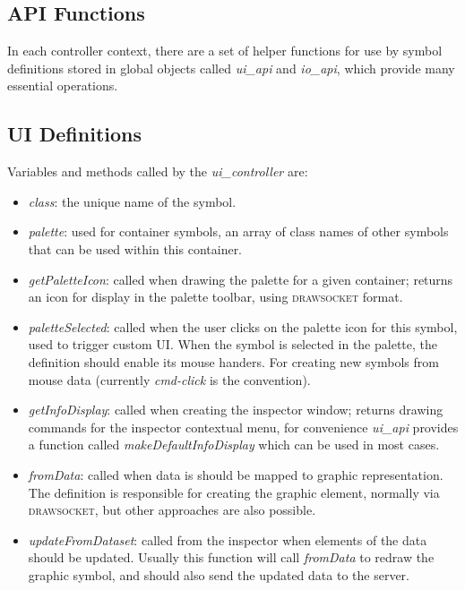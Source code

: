 \documentclass{article}
\def\drawsocket{\textsc{drawsocket}\xspace}
\def\uicontroller{\textit{ui\_controller}\xspace}
\def\uiapi{\textit{ui\_api}\xspace}
\def\ioapi{\textit{io\_api}\xspace}
\begin{document}
\subsection*{API Functions}\label{sec:api_functions}

In each controller context, there are a set of helper functions for use by symbol definitions stored in global objects called \uiapi and \ioapi, which provide many essential operations.

\subsection{UI Definitions}\label{sec:ui_callbacks}

Variables and methods called by the \uicontroller are:

\begin{itemize}\itemsep0pt 
\item \textit{class}: the unique name of the symbol.
\item \textit{palette}: used for container symbols, an array of class names of other symbols that can be used within this container.

\item \textit{getPaletteIcon}: called when drawing the palette for a given container; returns an icon for display in the palette toolbar, using \drawsocket format.

\item \textit{paletteSelected}: called when the user clicks on the palette icon for this symbol, used to trigger custom UI. When the symbol is selected in the palette, the definition should enable its mouse handers. For creating new symbols from mouse data (currently \textit{cmd-click} is the convention).

\item \textit{getInfoDisplay}: called when creating the inspector window; returns drawing commands for the inspector contextual menu, for convenience \uiapi provides a function called \textit{makeDefaultInfoDisplay} which can be used in most cases.

\item \textit{fromData}: called when data is should be mapped to graphic representation. The definition is responsible for creating the graphic element, normally via \drawsocket, but other approaches are also possible.

\item \textit{updateFromDataset}: called from the inspector when elements of the data should be updated. Usually this function will call \textit{fromData} to redraw the graphic symbol, and should also send the updated data to the server.


\end{itemize}
\end{document}
